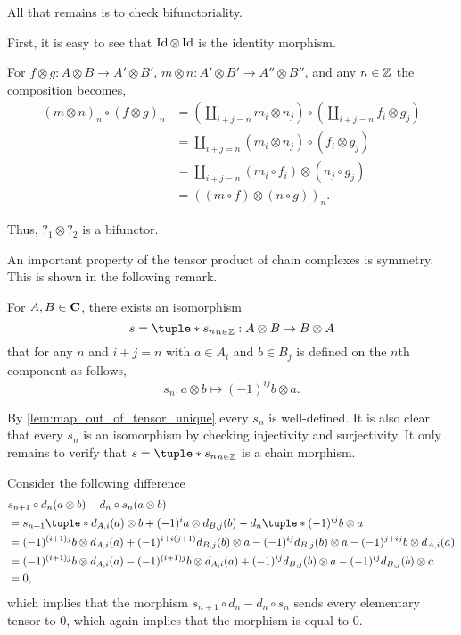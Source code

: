 \begin{remark}
    All that remains is to check bifunctoriality.

    First, it is easy to see that \( \operatorname{Id} \otimes \operatorname{Id} \) is the identity morphism.
    
    For \( f \otimes g: A \otimes B \to A' \otimes B' \), \( m \otimes n: A' \otimes B' \to A'' \otimes B'' \), and any \( n \in {\mathbb{Z}} \) the composition becomes,
    \begin{align*}
        (m \otimes n)_n \circ (f \otimes g)_n &= (\coprod_{i + j = n} m_i \otimes n_j) \circ (\coprod_{i + j = n} f_i \otimes g_j) \\
        &= \coprod_{i + j = n} (m_i \otimes n_j) \circ (f_i \otimes g_j) \\
        &= \coprod_{i + j = n} (m_i \circ f_i) \otimes (n_j \circ g_j) \\
        &= ((m \circ f) \otimes (n \circ g))_n.
    \end{align*}

    Thus, \( ?_1 \otimes ?_2 \) is a bifunctor.
\end{remark}

An important property of the tensor product of chain complexes is symmetry. This is shown in the following remark.

\begin{remark}
    \label{rem:symmetry_tensor_product_of_chain_complex}
    For \( A, B \in \operatorname{\mathbf{C}} \), there exists an isomorphism
    \[
        s = \tuple*{s_n}_{n \in \Zb}: A \otimes B \to B \otimes A
    \]
    that for any \( n \) and \( i + j = n \) with \( a \in A_i \) and \( b \in B_j \) is defined on the \( n \)th component as follows,
    \[
        s_n: a \otimes b \mapsto (-1)^{ij} b \otimes a.
    \]

    By \autoref{lem:map_out_of_tensor_unique} every \( s_n \) is well-defined. It is also clear that every \( s_n \) is an isomorphism by checking injectivity and surjectivity. It only remains to verify that \( s = \tuple*{s_n}_{n \in \Zb} \) is a chain morphism.

    Consider the following difference
    \begin{align*}
        &s_{n + 1} \circ d_n(a \otimes b) - d_n \circ s_n (a \otimes b) \\
        &= s_{n + 1} \tuple*{d_{A, i}(a) \otimes b + (-1)^i a \otimes d_{B, j}(b)} - d_n \tuple*{ (-1)^{ij} b \otimes a } \\
        &= (-1)^{(i + 1)j} b \otimes d_{A, i}(a) + (-1)^{i + i(j + 1)} d_{B, j}(b) \otimes a - (-1)^{ij} d_{B, j}(b) \otimes a - (-1)^{j + ij} b \otimes d_{A, i}(a) \\
        &= (-1)^{(i + 1)j} b \otimes d_{A, i}(a) - (-1)^{(i + 1)j} b \otimes d_{A, i}(a) + (-1)^{ij} d_{B, j}(b) \otimes a - (-1)^{ij} d_{B, j}(b) \otimes a \\
        &= 0,
    \end{align*}
    which implies that the morphism \( s_{n + 1} \circ d_n - d_n \circ s_n \) sends every elementary tensor to \( 0 \), which again implies that the morphism is equal to \( 0 \).
\end{remark}

